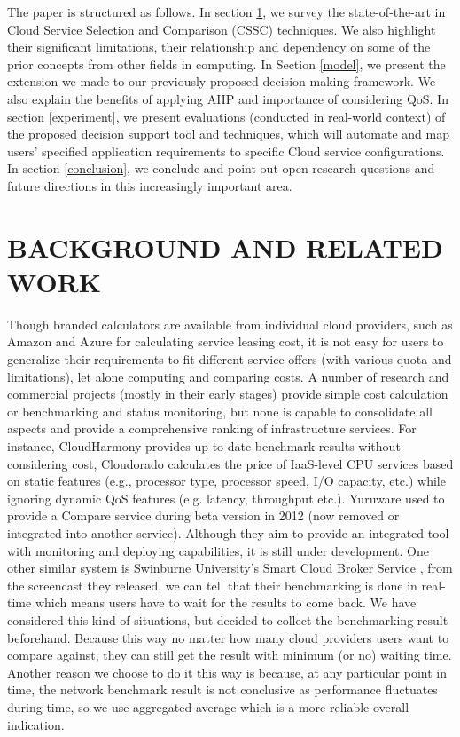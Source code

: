 \documentclass[journal]{IEEEtran}
\begin{document}
The paper is structured as follows. In section \ref{related}, we survey the state-of-the-art in Cloud Service Selection and Comparison (CSSC) techniques. We also highlight their significant limitations, their relationship and dependency on some of the prior concepts from other fields in computing. In Section \ref{model}, we present the extension we made to our previously proposed decision making framework. We also explain the benefits of applying AHP and importance of considering QoS. In section \ref{experiment}, we present evaluations (conducted in real-world context) of the proposed decision support tool and techniques, which will automate and map users' specified application requirements to specific Cloud service configurations. In section \ref{conclusion}, we conclude and point out open research questions and future directions in this increasingly important area.



\section{BACKGROUND AND RELATED WORK}\label{related}

Though branded calculators are available from individual cloud providers, such as Amazon \cite{ref21} and Azure \cite{ref22} for calculating service leasing cost, it is not easy for users to generalize their requirements to fit different service offers (with various quota and limitations), let alone computing and comparing costs. A number of research    \cite{li2010cloudcmp} and commercial projects (mostly in their early stages) provide simple cost calculation or benchmarking and status monitoring, but none is capable to consolidate all aspects and provide a comprehensive ranking of infrastructure services. For instance, CloudHarmony \cite{ref24} provides up-to-date benchmark results without considering cost, Cloudorado \cite{ref25} calculates the price of IaaS-level CPU services based on static features (e.g., processor type, processor speed, I/O capacity, etc.) while ignoring dynamic QoS features (e.g. latency, throughput etc.). Yuruware \cite{ref26} used to provide a Compare service during beta version in 2012 (now removed or integrated into another service). Although they aim to provide an integrated tool with monitoring and deploying capabilities, it is still under development. One other similar system is Swinburne University's Smart Cloud Broker Service \cite{ref27}, from the screencast they released, we can tell that their benchmarking is done in real-time which means users have to wait for the results to come back. We have considered this kind of situations, but decided to collect the benchmarking result beforehand. Because this way no matter how many cloud providers users want to compare against, they can still get the result with minimum (or no) waiting time. Another reason we choose to do it this way is because, at any particular point in time, the network benchmark result is not conclusive as performance fluctuates during time, so we use aggregated average which is a more reliable overall indication.
\end{document}
